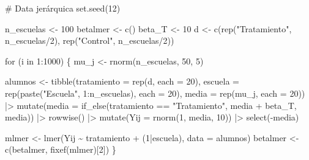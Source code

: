 \documentclass[
  letterpaper,
  DIV=11,
  numbers=noendperiod,
  oneside]{scrreprt}
\newenvironment{Shaded}{\begin{snugshade}}{\end{snugshade}}
\newcommand{\AttributeTok}[1]{\textcolor[rgb]{0.40,0.45,0.13}{#1}}
\newcommand{\CommentTok}[1]{\textcolor[rgb]{0.37,0.37,0.37}{#1}}
\newcommand{\ControlFlowTok}[1]{\textcolor[rgb]{0.00,0.23,0.31}{#1}}
\newcommand{\DecValTok}[1]{\textcolor[rgb]{0.68,0.00,0.00}{#1}}
\newcommand{\FunctionTok}[1]{\textcolor[rgb]{0.28,0.35,0.67}{#1}}
\newcommand{\NormalTok}[1]{\textcolor[rgb]{0.00,0.23,0.31}{#1}}
\newcommand{\OtherTok}[1]{\textcolor[rgb]{0.00,0.23,0.31}{#1}}
\newcommand{\SpecialCharTok}[1]{\textcolor[rgb]{0.37,0.37,0.37}{#1}}
\newcommand{\StringTok}[1]{\textcolor[rgb]{0.13,0.47,0.30}{#1}}
\begin{document}
\begin{Shaded}
\begin{Highlighting}[]
\CommentTok{\# Data jerárquica}
\FunctionTok{set.seed}\NormalTok{(}\DecValTok{12}\NormalTok{)}

\NormalTok{n\_escuelas }\OtherTok{\textless{}{-}} \DecValTok{100}
\NormalTok{betalmer }\OtherTok{\textless{}{-}} \FunctionTok{c}\NormalTok{()}
\NormalTok{beta\_T }\OtherTok{\textless{}{-}} \DecValTok{10}
\NormalTok{d }\OtherTok{\textless{}{-}} \FunctionTok{c}\NormalTok{(}\FunctionTok{rep}\NormalTok{(}\StringTok{"Tratamiento"}\NormalTok{, n\_escuelas}\SpecialCharTok{/}\DecValTok{2}\NormalTok{), }\FunctionTok{rep}\NormalTok{(}\StringTok{"Control"}\NormalTok{,  n\_escuelas}\SpecialCharTok{/}\DecValTok{2}\NormalTok{))}

\ControlFlowTok{for}\NormalTok{ (i }\ControlFlowTok{in} \DecValTok{1}\SpecialCharTok{:}\DecValTok{1000}\NormalTok{) \{}
\NormalTok{  mu\_j }\OtherTok{\textless{}{-}} \FunctionTok{rnorm}\NormalTok{(n\_escuelas, }\DecValTok{50}\NormalTok{, }\DecValTok{5}\NormalTok{)}
  
\NormalTok{  alumnos }\OtherTok{\textless{}{-}} \FunctionTok{tibble}\NormalTok{(}\AttributeTok{tratamiento =} \FunctionTok{rep}\NormalTok{(d, }\AttributeTok{each =} \DecValTok{20}\NormalTok{), }
                    \AttributeTok{escuela =} \FunctionTok{rep}\NormalTok{(}\FunctionTok{paste}\NormalTok{(}\StringTok{"Escuela"}\NormalTok{, }\DecValTok{1}\SpecialCharTok{:}\NormalTok{n\_escuelas), }\AttributeTok{each =} \DecValTok{20}\NormalTok{),}
                    \AttributeTok{media =} \FunctionTok{rep}\NormalTok{(mu\_j, }\AttributeTok{each =} \DecValTok{20}\NormalTok{)) }\SpecialCharTok{|\textgreater{}}
    \FunctionTok{mutate}\NormalTok{(}\AttributeTok{media =} \FunctionTok{if\_else}\NormalTok{(tratamiento }\SpecialCharTok{==} \StringTok{"Tratamiento"}\NormalTok{, media }\SpecialCharTok{+}\NormalTok{ beta\_T, media)) }\SpecialCharTok{|\textgreater{}}
    \FunctionTok{rowwise}\NormalTok{() }\SpecialCharTok{|\textgreater{}}
    \FunctionTok{mutate}\NormalTok{(}\AttributeTok{Yij =} \FunctionTok{rnorm}\NormalTok{(}\DecValTok{1}\NormalTok{, media, }\DecValTok{10}\NormalTok{)) }\SpecialCharTok{|\textgreater{}}
    \FunctionTok{select}\NormalTok{(}\SpecialCharTok{{-}}\NormalTok{media)}
  
\NormalTok{  mlmer }\OtherTok{\textless{}{-}} \FunctionTok{lmer}\NormalTok{(Yij }\SpecialCharTok{\textasciitilde{}}\NormalTok{ tratamiento }\SpecialCharTok{+}\NormalTok{ (}\DecValTok{1}\SpecialCharTok{|}\NormalTok{escuela), }\AttributeTok{data =}\NormalTok{ alumnos)}
\NormalTok{  betalmer }\OtherTok{\textless{}{-}} \FunctionTok{c}\NormalTok{(betalmer, }\FunctionTok{fixef}\NormalTok{(mlmer)[}\DecValTok{2}\NormalTok{])}
\NormalTok{\}}


\end{Highlighting}
\end{Shaded}
\end{document}
